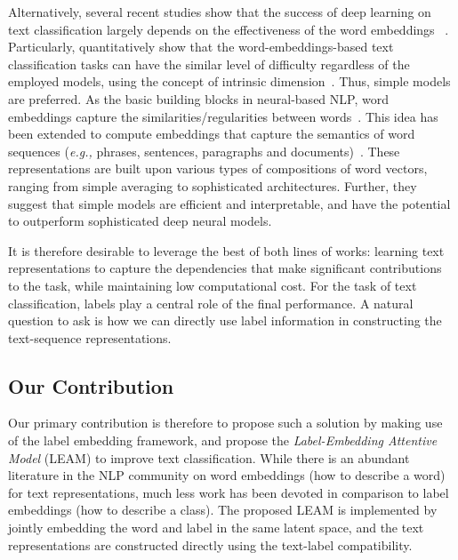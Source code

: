 \documentclass[11pt,a4paper]{article}
\newcommand{\eg}[0]{\emph{e.g., }}
\begin{document}
Alternatively, several recent studies show that the success of deep learning on text classification largely depends on the effectiveness of the word embeddings
~\cite{joulin2016bag,wieting2016towards,arora2017simple,shen2018on}.
Particularly, \citet{shen2018on} quantitatively show that the word-embeddings-based text classification tasks can have the similar level of difficulty regardless of the employed models, using the concept of intrinsic dimension~\cite{li_id_2018_ICLR}. Thus, simple models are preferred.  As the basic building blocks in neural-based NLP, word embeddings capture the similarities/regularities between words~\cite{mikolov2013distributed,pennington2014glove}. This idea has been extended to compute embeddings that capture the semantics of word sequences (\eg phrases, sentences, paragraphs and documents)~\cite{le2014distributed,kiros2015skip}. These representations are built upon various types of compositions of word vectors, ranging from simple averaging to sophisticated architectures. Further, they suggest that simple models are efficient and interpretable, and have the potential to outperform sophisticated deep neural models. 

It is therefore desirable to leverage the best of both lines of works: learning text representations to capture the dependencies that make significant contributions to the task, while maintaining low computational cost. For the task of text classification, labels play a central role of the final performance. A natural question to ask is how we can directly use label information in constructing the text-sequence representations.

\subsection{Our Contribution}
Our primary contribution is therefore to propose such a
solution by making use of the label embedding framework, and propose the  
{\em Label-Embedding Attentive Model} (LEAM) to improve text classification.
While there is an abundant literature in the NLP community on word embeddings (how to describe a word) for text representations, much less work has been devoted in comparison to label embeddings (how to describe a class). The proposed LEAM is implemented by jointly embedding the word and label in the same latent space, and the text representations are constructed directly using the text-label compatibility.
\end{document}
